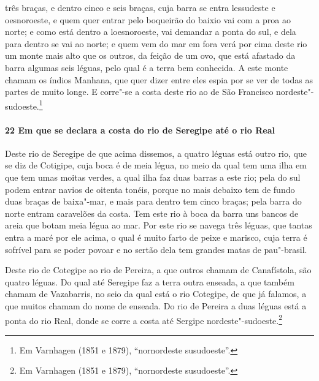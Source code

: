\begin{linenumbers}
três braças, e dentro cinco e seis braças, cuja barra se entra lessudeste e oesnoroeste, e
quem quer entrar pelo boqueirão do baixio vai com a proa ao norte; e como está dentro a
loesnoroeste, vai demandar a ponta do sul, e dela para dentro se vai ao norte; e quem vem
do mar em fora verá por cima deste rio um monte mais alto que os outros, da feição de um
ovo, que está afastado da barra algumas seis léguas, pelo qual é a terra bem conhecida. A
este monte chamam os índios Manhana, que quer dizer entre eles espia por se ver de todas
as partes de muito longe. E corre"-se a costa deste rio ao de São Francisco
nordeste"-sudoeste.\footnote{ Em Varnhagen (1851 e 1879), ``nornordeste susudoeste''.}

\paragraph{22 Em que se declara a costa do rio de Seregipe até o rio Real} \quad
Deste rio de Seregipe de que acima dissemos, a quatro léguas está outro rio, que se diz de
Cotigipe, cuja boca é de meia légua, no meio da qual tem uma ilha em que tem umas moitas
verdes, a qual ilha faz duas barras a este rio; pela do sul podem entrar navios de oitenta
tonéis, porque no mais debaixo tem de fundo duas braças de baixa"-mar, e mais para dentro
tem cinco braças; pela barra do norte entram caravelões da costa. Tem este rio à boca da
barra uns bancos de areia que botam meia légua ao mar. Por este rio se navega três léguas,
que tantas entra a maré por ele acima, o qual é muito farto de peixe e marisco, cuja terra
é sofrível para se poder povoar e no sertão dela tem grandes matas de pau"-brasil.

Deste rio de Cotegipe ao rio de Pereira, a que outros chamam de Canafístola, são quatro
léguas. Do qual até Seregipe faz a terra outra enseada, a que também chamam de Vazabarris,
no seio da qual está o rio Cotegipe, de que já falamos, a que muitos chamam do nome de
enseada. Do rio de Pereira a duas léguas está a ponta do rio Real, donde se corre a costa
até Sergipe nordeste"-sudoeste.\footnote{ Em Varnhagen (1851 e 1879), ``nornordeste
susudoeste''.}


\end{linenumbers}
